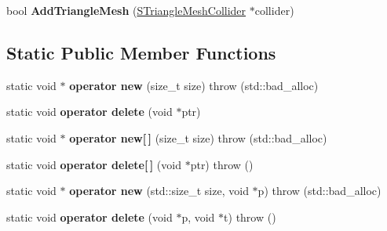 \begin{DoxyCompactItemize}
\item 
bool {\bfseries Add\+Triangle\+Mesh} (\hyperlink{classirr_1_1core_1_1STriangleMeshCollider}{S\+Triangle\+Mesh\+Collider} $\ast$collider)\hypertarget{classirr_1_1core_1_1SCompoundCollider_ab5955ee708e7278698e8c21a55a089c4}{}\label{classirr_1_1core_1_1SCompoundCollider_ab5955ee708e7278698e8c21a55a089c4}

\end{DoxyCompactItemize}
\subsection*{Static Public Member Functions}
\begin{DoxyCompactItemize}
\item 
static void $\ast$ {\bfseries operator new} (size\+\_\+t size)  throw (std\+::bad\+\_\+alloc)\hypertarget{classirr_1_1core_1_1SCompoundCollider_acfc4f87261ebf7a2997a28f986fee3c1}{}\label{classirr_1_1core_1_1SCompoundCollider_acfc4f87261ebf7a2997a28f986fee3c1}

\item 
static void {\bfseries operator delete} (void $\ast$ptr)\hypertarget{classirr_1_1core_1_1SCompoundCollider_ad5b32709f996403f74bf9e1d11726bc2}{}\label{classirr_1_1core_1_1SCompoundCollider_ad5b32709f996403f74bf9e1d11726bc2}

\item 
static void $\ast$ {\bfseries operator new\mbox{[}$\,$\mbox{]}} (size\+\_\+t size)  throw (std\+::bad\+\_\+alloc)\hypertarget{classirr_1_1core_1_1SCompoundCollider_a6563ecadbf33301ba222e954de779b86}{}\label{classirr_1_1core_1_1SCompoundCollider_a6563ecadbf33301ba222e954de779b86}

\item 
static void {\bfseries operator delete\mbox{[}$\,$\mbox{]}} (void $\ast$ptr)  throw ()\hypertarget{classirr_1_1core_1_1SCompoundCollider_ae753b273fe5d3441888b3bc7e390fa81}{}\label{classirr_1_1core_1_1SCompoundCollider_ae753b273fe5d3441888b3bc7e390fa81}

\item 
static void $\ast$ {\bfseries operator new} (std\+::size\+\_\+t size, void $\ast$p)  throw (std\+::bad\+\_\+alloc)\hypertarget{classirr_1_1core_1_1SCompoundCollider_af516fc4d55d08cede68e7715f6694c4f}{}\label{classirr_1_1core_1_1SCompoundCollider_af516fc4d55d08cede68e7715f6694c4f}

\item 
static void {\bfseries operator delete} (void $\ast$p, void $\ast$t)  throw ()\hypertarget{classirr_1_1core_1_1SCompoundCollider_a061ed5627c6dc32867435e6ba1e793b2}{}\label{classirr_1_1core_1_1SCompoundCollider_a061ed5627c6dc32867435e6ba1e793b2}


\end{DoxyCompactItemize}
